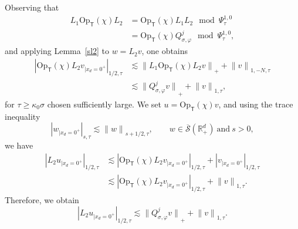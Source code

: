 \documentclass[10pt]{amsart}
\theoremstyle{plain}
\theoremstyle{definition}
\def\R{\mathbb{R}}
\newcommand{\suff}{sufficiently\xspace}
\let\k\kappa
\newcommand{\br}{\ensuremath{_{|x_d=0^+}}}
\newcommand{\Opt}{\ensuremath{\mathrm{Op}_{\scriptscriptstyle{\mathsf{T}}}}}
\newcommand{\Norm}[2]{{\| #1 \|}_{#2}}
\newcommand{\Normsc}[2]{{\| #1 \|}_{#2, \tau}}
\newcommand{\normsc}[2]{{| #1 |}_{#2, \tau}}
\newcommand{\Psisc}{\Psi_\tau}
\newcommand{\Qconj}{Q_{\sigma,\varphi}}
\newcommand{\Sbarp}{\ensuremath{\overline{\mathscr{S}}(\Rdp)}}
\newcommand{\Rdp}{\R^d_+}
\begin{document}
Observing that
\begin{align*}
L_1 \Opt(\chi)L_2 &=\Opt(\chi)L_1 L_2 \mod \Psisc^{1,0}\\
&= \Opt(\chi)\Qconj^j \mod \Psisc^{1,0},
\end{align*}
and applying Lemma~\ref{sl2} to $w=L_2 v$, one obtains
\begin{align*}
\normsc{\Opt(\chi) L_2 v\br}{1/2}
&\lesssim \Norm{L_1 \Opt(\chi) L_2 v}{+}
+\Normsc{v}{1,-N}\\
&\lesssim \Norm{\Qconj^jv}{+}
+\Normsc{v}{1},
\end{align*}
for $\tau \geq \k_0 \sigma$ chosen \suff large.
We set $u=\Opt(\chi)v$, and using the trace inequality
\begin{equation*}
\normsc{w\br}{s}\lesssim \Normsc{w}{s+1/2},
\qquad w\in
\Sbarp \ \text{and} \ s>0,
\end{equation*}
we have
\begin{align*}
\normsc{L_2 u\br}{1/2}
&\lesssim \normsc{\Opt(\chi)L_2 v\br}{1/2}+\normsc{v\br}{1/2}\\
&\lesssim \normsc{\Opt(\chi)L_2 v\br}{1/2} + \Normsc{v}{1}.
\end{align*}
Therefore, we obtain
\begin{equation*}
\normsc{L_2 u\br}{1/2}
\lesssim \Norm{\Qconj^jv}{+}
+\Normsc{v}{1}.
\end{equation*}
\end{document}
